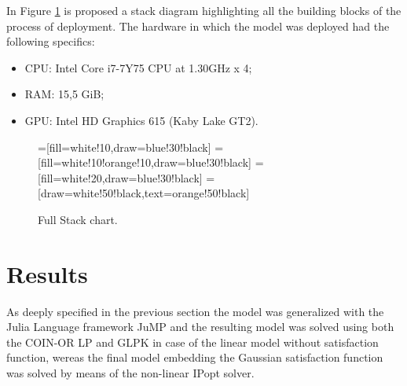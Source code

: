 \documentclass[conference,final,]{IEEEtran}
\begin{document}
In Figure \ref{stack} is proposed a stack diagram highlighting all the building blocks of the process of deployment. The hardware in which the model was deployed had the following specifics:
\begin{itemize}
\item CPU: Intel Core i7-7Y75 CPU at 1.30GHz x 4;
\item RAM: 15,5 GiB;
\item GPU: Intel HD Graphics 615 (Kaby Lake GT2).
\end{itemize}
\begin{figure}[]
\begin{center}{
=[fill=white!10,draw=blue!30!black]
=[fill=white!10!orange!10,draw=blue!30!black]
=[fill=white!20,draw=blue!30!black]
=[draw=white!50!black,text=orange!50!black]
\begin{drawstack}
\end{drawstack}}
\end{center}
\caption{Full Stack chart.}
\label{stack}
\end{figure}

\hypertarget{results}{%
\section{Results}\label{results}}
As deeply specified in the previous section the model was generalized with the Julia Language framework JuMP and the resulting model was solved using both the COIN-OR LP and GLPK in case of the linear model without satisfaction function, wereas the final model embedding the Gaussian satisfaction function was solved by means of the non-linear IPopt solver.
\end{document}
